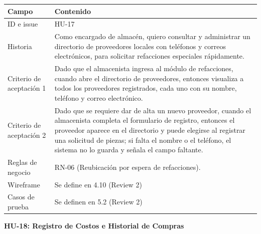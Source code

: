 {\def\LTcaptype{none} %
\begin{longtable}[]{@{}
  >{\raggedright\arraybackslash}p{}
  >{\raggedright\arraybackslash}p{}@{}}
\toprule\noalign{}
\begin{minipage}[b]{\linewidth}\raggedright
\textbf{Campo}
\end{minipage} & \begin{minipage}[b]{\linewidth}\raggedright
\textbf{Contenido}
\end{minipage} \\
\midrule\noalign{}
\endhead
\bottomrule\noalign{}
\endlastfoot
ID e issue & HU-17 \\
Historia & Como encargado de almacén, quiero consultar y administrar un
directorio de proveedores locales con teléfonos y correos electrónicos,
para solicitar refacciones especiales rápidamente. \\
Criterio de aceptación 1 & Dado que el almacenista ingresa al módulo de
refacciones, cuando abre el directorio de proveedores, entonces
visualiza a todos los proveedores registrados, cada uno con su nombre,
teléfono y correo electrónico. \\
Criterio de aceptación 2 & Dado que se requiere dar de alta un nuevo
proveedor, cuando el almacenista completa el formulario de registro,
entonces el proveedor aparece en el directorio y puede elegirse al
registrar una solicitud de piezas; si falta el nombre o el teléfono, el
sistema no lo guarda y señala el campo faltante. \\
Reglas de negocio & RN-06 (Reubicación por espera de refacciones). \\
Wireframe & Se define en 4.10 (Review 2) \\
Casos de prueba & Se definen en 5.2 (Review 2) \\
\end{longtable}
}

\textbf{HU-18: Registro de Costos e Historial de Compras}

